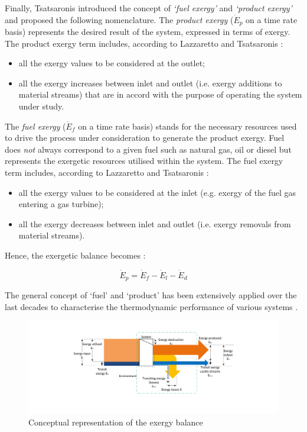 \documentclass[times,3p]{elsarticle}
\begin{document}
Finally, Tsatsaronis \cite{BejanAdrian;TsatsaronisGeorge;Moran1996,Tsatsaronis2007} introduced the concept of \emph{`fuel exergy'} and \emph{`product exergy'} and proposed the following nomenclature. The \emph{product exergy} ($\dot{E}_p$ on a time rate basis) represents the desired result of the system, expressed in terms of exergy. The product exergy term includes, according to Lazzaretto and Tsatsaronis \cite{Lazzaretto1999,Lazzaretto2006}:
	\begin{itemize}
		\item all the exergy values to be considered at the outlet;
		\item all the exergy increases between inlet and outlet (i.e. exergy additions to material streams) that are in accord with the purpose of operating the system under study.
	\end{itemize}
The \emph{fuel exergy} ($\dot{E}_f$ on a time rate basis) stands for the necessary resources used to drive the process under consideration to generate the product exergy. Fuel does \emph{not} always correspond to a given fuel such as natural gas, oil or diesel but represents the exergetic resources utilised within the system. The fuel exergy term includes, according to Lazzaretto and Tsatsaronis \cite{Lazzaretto1999,Lazzaretto2006}:
		\begin{itemize}
			\item all the exergy values to be considered at the inlet (e.g. exergy of the fuel gas entering a gas turbine);
			\item all the exergy decreases between inlet and outlet (i.e. exergy removals from material streams).
		\end{itemize}

Hence, the exergetic balance becomes \cite{BejanAdrian;TsatsaronisGeorge;Moran1996,Tsatsaronis2007}:

\begin{equation}
\dot{E}_p=\dot{E}_f-\dot{E}_l-\dot{E}_d
\end{equation}
		
The general concept of `fuel' and `product' has been extensively applied over the last decades to characterise the thermodynamic performance of various systems \cite{Tsatsaronis1985,Thermoeconomics2001,BejanAdrian;TsatsaronisGeorge;Moran1996,Tsatsaronis1993}. 

\begin{figure}[htbp]
	\centering
	\includegraphics[width=\linewidth]{balance.pdf}
	\caption{Conceptual representation of the exergy balance}
	\label{fig:balance}
\end{figure}
	
\end{document}

